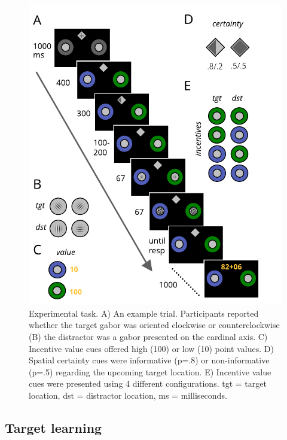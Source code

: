 \documentclass[11pt,halfline,a4paper,]{ouparticle}
\begin{document}
\begin{figure}[p]

{\centering \includegraphics[width=1\linewidth]{../images/doc-task-theory} 

}

\caption{Experimental task. A) An example trial. Participants reported whether the target gabor was oriented clockwise or counterclockwise (B) the distractor was a gabor presented on the cardinal axis. C) Incentive value cues offered high (100) or low (10) point values. D) Spatial certainty cues were informative (p=.8) or non-informative (p=.5) regarding the upcoming target location. E) Incentive value cues were presented using 4 different configurations. tgt = target location, dst = distractor location, ms = milliseconds.}\label{fig:tasktheory}
\end{figure}

\hypertarget{target-learning}{%
\subsection{Target learning}\label{target-learning}}
\end{document}
